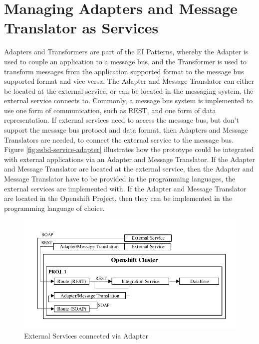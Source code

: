 \section{Managing Adapters and Message Translator as Services}
\label{sec:esbd-adap-trans-service}
Adapters and Transformers are part of the EI Patterns, whereby the Adapter is used to couple an application to a message bus, and the Transformer is used to transform messages from the application supported format to the message bus supported format and vice versa. The Adapter and Message Translator can either be  located at the external service, or can be located in the messaging system, the external service connects to. Commonly, a message bus system is implemented to use one form of communication, such as REST, and one form of data representation. If external services need to access the message bus, but don't support the message bus protocol and data format, then Adapters and Message Translators are needed, to connect the external service to the message bus. \\

Figure \vref{fig:esbd-service-adapter} illustrates how the prototype could be integrated with external applications via an Adapter and Message Translator. If the Adapter and Message Translator are located at the external service, then the Adapter and Message Translator have to be provided in the programming languages, the external services are implemented with. If the Adapter and Message Translator are located in the Openshift Project, then they can be implemented in the programming language of choice.

\begin{figure}[htbp]
	\centering
	\includegraphics[scale=1]{images/esbd-service-adapter.pdf}
	\caption{External Services connected via Adapter}
	\label{fig:esbd-service-adapter}
\end{figure}

